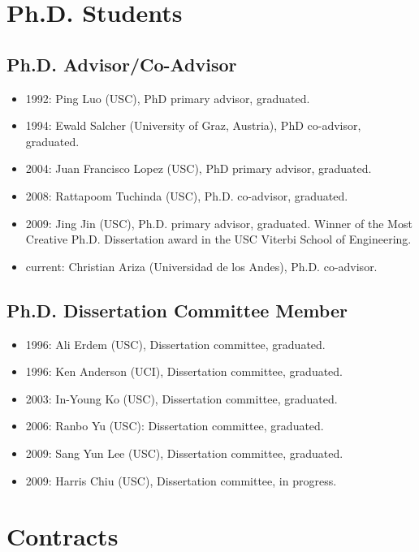 \documentclass{article}
\begin{document}
\section*{Ph.D. Students}

\subsection*{Ph.D. Advisor/Co-Advisor}
\begin{itemize}
\item 1992: Ping Luo (USC), PhD primary advisor, graduated.
\item 1994: Ewald Salcher (University of Graz, Austria), PhD co-advisor, graduated.
\item 2004: Juan Francisco Lopez (USC), PhD primary advisor, graduated.
\item 2008: Rattapoom Tuchinda (USC), Ph.D. co-advisor, graduated.
\item 2009: Jing Jin (USC), Ph.D. primary advisor, graduated. Winner of the Most Creative Ph.D. Dissertation award in the USC Viterbi School of Engineering.
\item current: Christian Ariza (Universidad de los Andes), Ph.D. co-advisor.
\end{itemize}

\subsection*{Ph.D. Dissertation Committee Member}
\begin{itemize}
\item 1996: Ali Erdem (USC), Dissertation committee, graduated.
\item 1996: Ken Anderson (UCI), Dissertation committee, graduated.
\item 2003: In-Young Ko (USC), Dissertation committee, graduated.
\item 2006: Ranbo Yu (USC): Dissertation committee, graduated.
\item 2009: Sang Yun Lee (USC), Dissertation committee, graduated.
\item 2009: Harris Chiu (USC), Dissertation committee, in progress.
\end{itemize}



\section*{Contracts}
\end{document}

